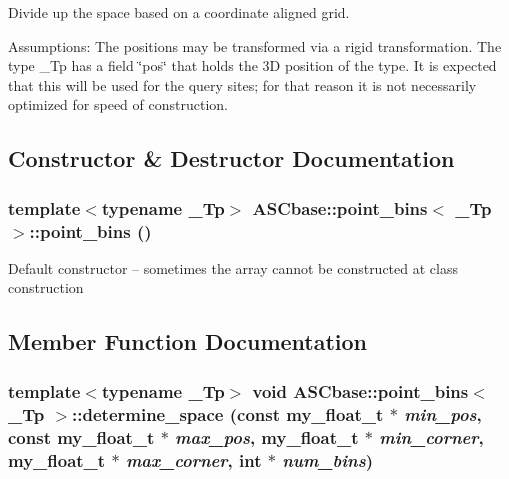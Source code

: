 Divide up the space based on a coordinate aligned grid. 

Assumptions: The positions may be transformed via a rigid transformation. The type \_\-Tp has a field \char`\"{}pos\char`\"{} that holds the 3D position of the type. It is expected that this will be used for the query sites; for that reason it is not necessarily optimized for speed of construction. 



\subsection{Constructor \& Destructor Documentation}
\subsubsection{\setlength{\rightskip}{0pt plus 5cm}template$<$typename \_\-Tp$>$ \bf{ASCbase::point\_\-bins}$<$ \_\-Tp $>$::\bf{point\_\-bins} ()\hspace{0.3cm}{\tt  [inline]}}\label{classASCbase_1_1point__bins_3e8b2c7e86f5ee787cc71f32cc8619da}


Default constructor -- sometimes the array cannot be constructed at class construction 

\subsection{Member Function Documentation}
\subsubsection{\setlength{\rightskip}{0pt plus 5cm}template$<$typename \_\-Tp$>$ void \bf{ASCbase::point\_\-bins}$<$ \_\-Tp $>$::determine\_\-space (const my\_\-float\_\-t $\ast$ {\em min\_\-pos}, const my\_\-float\_\-t $\ast$ {\em max\_\-pos}, my\_\-float\_\-t $\ast$ {\em min\_\-corner}, my\_\-float\_\-t $\ast$ {\em max\_\-corner}, int $\ast$ {\em num\_\-bins})\hspace{0.3cm}{\tt  [inline]}}\label{classASCbase_1_1point__bins_d0e79de47eb796a1d310e8ecf3edf3b5}


